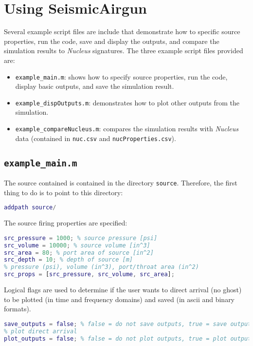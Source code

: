 \documentclass[10pt]{article}
\begin{document}
\section{Using {\bf SeismicAirgun}}
Several example script files are include that demonstrate how to specific source properties, run the code, save and display the outputs, and compare the simulation results to \emph{Nucleus} signatures. The three example script files provided are:
\begin{itemize}
\item \texttt{example\_main.m}: shows how to specify source properties, run the code, display basic outputs, and save the simulation result.
\item \texttt{example\_dispOutputs.m}: demonstrates how to plot other outputs from the simulation.
\item \texttt{example\_compareNucleus.m}: compares the simulation results with \emph{Nucleus} data (contained in \texttt{nuc.csv} and \texttt{nucProperties.csv}).
\end{itemize}

\subsection{\texttt{example\_main.m}}
The source contained is contained in the directory \texttt{source}. Therefore, the first thing to do is to point to this directory:
\begin{lstlisting}[language=Matlab]
addpath source/
\end{lstlisting}

The source firing properties are specified:
\begin{lstlisting}[language=Matlab]
% Source Firing Configuration
src_pressure = 1000; % source pressure [psi]
src_volume = 10000; % source volume [in^3]
src_area = 80; % port area of source [in^2]
src_depth = 10; % depth of source [m]
% pressure (psi), volume (in^3), port/throat area (in^2)
src_props = [src_pressure, src_volume, src_area]; 
\end{lstlisting}

Logical flags are used to determine if the user wants to direct arrival (no ghost) to be plotted (in time and frequency domains) and saved (in ascii and binary formats).
\begin{lstlisting}[language=Matlab]
% save direct arrival
save_outputs = false; % false = do not save outputs, true = save outputs
% plot direct arrival 
plot_outputs = false; % false = do not plot outputs, true = plot outputs
\end{lstlisting}
\end{document}
